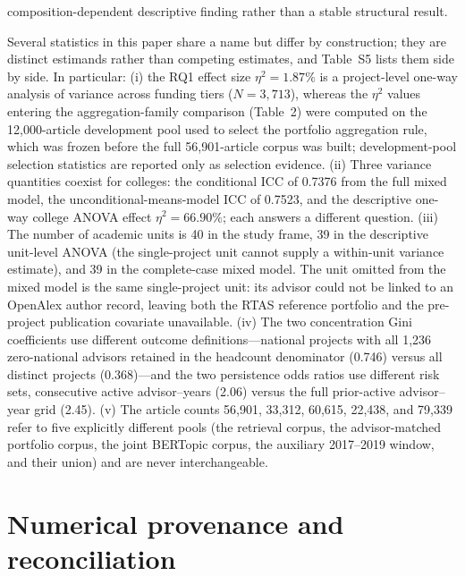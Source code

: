 composition-dependent descriptive finding rather than a stable structural result.

Several statistics in this paper share a name but differ by construction; they are distinct estimands rather than competing estimates, and Table~S5 lists them side by side. In particular: (i) the RQ1 effect size $\eta^2=1.87\%$ is a project-level one-way analysis of variance across funding tiers ($N=3{,}713$), whereas the $\eta^2$ values entering the aggregation-family comparison (Table~2) were computed on the 12,000-article development pool used to select the portfolio aggregation rule, which was frozen before the full 56,901-article corpus was built; development-pool selection statistics are reported only as selection evidence. (ii) Three variance quantities coexist for colleges: the conditional ICC of 0.7376 from the full mixed model, the unconditional-means-model ICC of 0.7523, and the descriptive one-way college ANOVA effect $\eta^2=66.90\%$; each answers a different question. (iii) The number of academic units is 40 in the study frame, 39 in the descriptive unit-level ANOVA (the single-project unit cannot supply a within-unit variance estimate), and 39 in the complete-case mixed model. The unit omitted from the mixed model is the same single-project unit: its advisor could not be linked to an OpenAlex author record, leaving both the RTAS reference portfolio and the pre-project publication covariate unavailable. (iv) The two concentration Gini coefficients use different outcome definitions---national projects with all 1,236 zero-national advisors retained in the headcount denominator (0.746) versus all distinct projects (0.368)---and the two persistence odds ratios use different risk sets, consecutive active advisor--years (2.06) versus the full prior-active advisor--year grid (2.45). (v) The article counts 56,901, 33,312, 60,615, 22,438, and 79,339 refer to five explicitly different pools (the retrieval corpus, the advisor-matched portfolio corpus, the joint BERTopic corpus, the auxiliary 2017--2019 window, and their union) and are never interchangeable.



\section*{Numerical provenance and reconciliation}

